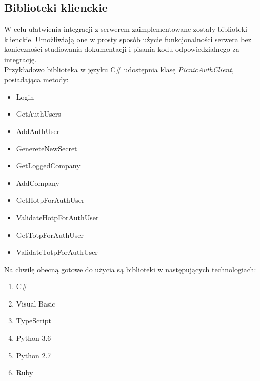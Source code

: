\subsection{Biblioteki klienckie}
W celu ułatwienia integracji z serwerem zaimplementowane zostały biblioteki klienckie.
Umożliwiają one w prosty sposób użycie funkcjonalności serwera bez konieczności 
studiowania dokumentacji i pisania kodu odpowiedzialnego za integrację. \\
Przykładowo biblioteka w języku C\# udostępnia klasę \textit{PicnicAuthClient}, posiadająca metody:
\begin{itemize}
	\item Login
	\item GetAuthUsers
	\item AddAuthUser
	\item GenereteNewSecret
	\item GetLoggedCompany
	\item AddCompany
	\item GetHotpForAuthUser
	\item ValidateHotpForAuthUser
	\item GetTotpForAuthUser
	\item ValidateTotpForAuthUser
\end{itemize}
Na chwilę obecną gotowe do użycia są biblioteki w następujących technologiach:
\begin{enumerate}
	\item C\#
	\item Visual Basic
	\item TypeScript
	\item Python 3.6
	\item Python 2.7
	\item Ruby
\end{enumerate}

